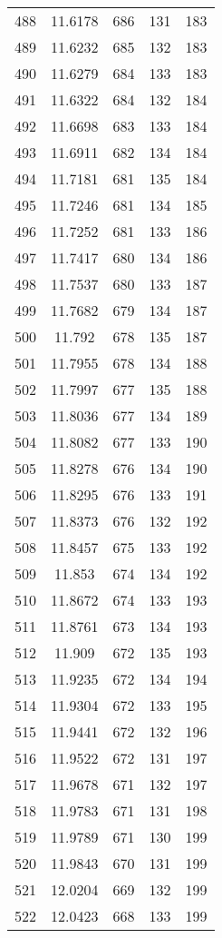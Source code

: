 \documentclass[12pt,a4paper]{article}
\begin{document}
\begin{tabular}{r|cccc}
	488 & 11.6178 & 686 & 131 & 183 \\
	489 & 11.6232 & 685 & 132 & 183 \\
	490 & 11.6279 & 684 & 133 & 183 \\
	491 & 11.6322 & 684 & 132 & 184 \\
	492 & 11.6698 & 683 & 133 & 184 \\
	493 & 11.6911 & 682 & 134 & 184 \\
	494 & 11.7181 & 681 & 135 & 184 \\
	495 & 11.7246 & 681 & 134 & 185 \\
	496 & 11.7252 & 681 & 133 & 186 \\
	497 & 11.7417 & 680 & 134 & 186 \\
	498 & 11.7537 & 680 & 133 & 187 \\
	499 & 11.7682 & 679 & 134 & 187 \\
	500 & 11.792 & 678 & 135 & 187 \\
	501 & 11.7955 & 678 & 134 & 188 \\
	502 & 11.7997 & 677 & 135 & 188 \\
	503 & 11.8036 & 677 & 134 & 189 \\
	504 & 11.8082 & 677 & 133 & 190 \\
	505 & 11.8278 & 676 & 134 & 190 \\
	506 & 11.8295 & 676 & 133 & 191 \\
	507 & 11.8373 & 676 & 132 & 192 \\
	508 & 11.8457 & 675 & 133 & 192 \\
	509 & 11.853 & 674 & 134 & 192 \\
	510 & 11.8672 & 674 & 133 & 193 \\
	511 & 11.8761 & 673 & 134 & 193 \\
	512 & 11.909 & 672 & 135 & 193 \\
	513 & 11.9235 & 672 & 134 & 194 \\
	514 & 11.9304 & 672 & 133 & 195 \\
	515 & 11.9441 & 672 & 132 & 196 \\
	516 & 11.9522 & 672 & 131 & 197 \\
	517 & 11.9678 & 671 & 132 & 197 \\
	518 & 11.9783 & 671 & 131 & 198 \\
	519 & 11.9789 & 671 & 130 & 199 \\
	520 & 11.9843 & 670 & 131 & 199 \\
	521 & 12.0204 & 669 & 132 & 199 \\
	522 & 12.0423 & 668 & 133 & 199 \\

\end{tabular}
\end{document}
